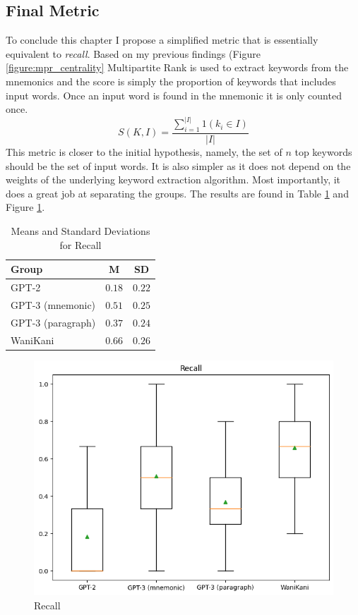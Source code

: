 \subsection{Final Metric}
To conclude this chapter I propose a simplified metric that is essentially equivalent to \emph{recall}. Based on my previous findings (Figure \ref{figure:mpr_centrality} Multipartite Rank is used to extract keywords from the mnemonics and the score is simply the proportion of keywords that includes input words. Once an input word is found in the mnemonic it is only counted once. 
\begin{equation}
    S(K, I) = \frac{\sum_{i=1}^{|I|} 1(k_i \in I)}{|I|}
\end{equation}
This metric is closer to the initial hypothesis, namely, the set of $n$ top keywords should be the set of input words. It is also simpler as it does not depend on the weights of the underlying keyword extraction algorithm. Most importantly, it does a great job at separating the groups. The results are found in Table \ref{tab:final_metric_recall} and Figure \ref{figure:recall}.
\begin{table}[ht] 
\centering
\caption{Means and Standard Deviations for Recall}
\label{table:group_stats}
\begin{tabular}{lcc}
\toprule
Group & M & SD\\
\midrule
GPT-2& $0.18$ & $0.22$ \\
GPT-3 (mnemonic) & $0.51$ & $0.25$ \\
GPT-3 (paragraph)& $0.37$ & $0.24$ \\
WaniKani & $0.66$ & $0.26$ \\
\bottomrule
\end{tabular}
\label{tab:final_metric_recall}
\end{table}
\begin{figure}
    \centering
    \includegraphics[width=400pt]{resources/recall.png}
    \caption{Recall}
    \label{figure:recall}
\end{figure}





